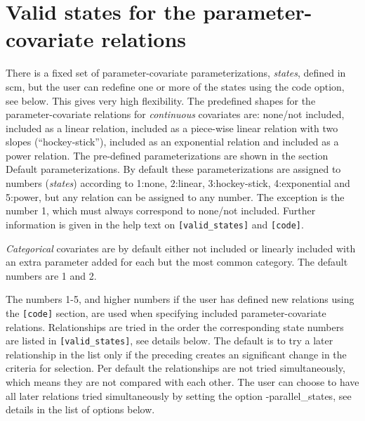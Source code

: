 \section{Valid states for the parameter-covariate relations}
There is a fixed set of parameter-covariate parameterizations, \emph{states}, 
defined in scm, but the user can redefine one or more of 
the states using the code option, see below. This gives very high flexibility. The predefined shapes for the 
parameter-covariate relations for \emph{continuous} covariates are: none/not included, included as a linear 
relation, included as a piece-wise linear relation with two slopes (“hockey-stick”), included as an exponential 
relation and included as a power relation. 
The pre-defined parameterizations are shown in the section Default parameterizations. 
By default these parameterizations are assigned to numbers (\emph{states}) 
according to 1:none,  2:linear, 3:hockey-stick, 4:exponential and 5:power, but any relation can be assigned 
to any number. 
The exception is the number 1, which must always correspond to none/not included. Further information is given in 
the help text on \verb|[valid_states]| and \verb|[code]|. 

\emph{Categorical} covariates are by default either not included or linearly included with an extra parameter added for each but the most common category. The default numbers are 1 and 2.

The numbers 1-5, and higher numbers if the user has defined new relations using the \verb|[code]| section, are 
used when specifying included parameter-covariate relations. Relationships are tried in the order the 
corresponding 
state numbers are listed in \verb|[valid_states]|, see details below. The default is to try a later 
relationship in the list only if the preceding creates an significant change in the criteria for selection. 
Per default the relationships are not tried simultaneously, which means they are not compared with each other. 
The user can choose to have all later relations tried simultaneously by setting the option -parallel\_states, see 
details in the list of options below.

